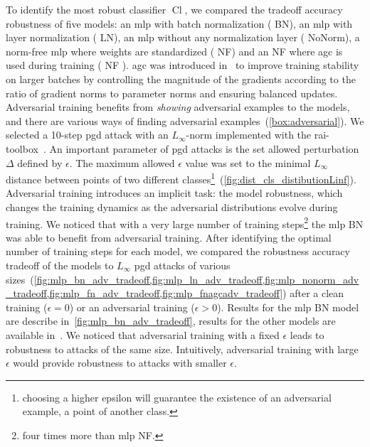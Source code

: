 \documentclass[../main.tex]{subfiles}
\begin{document}
		To identify the most robust classifier \(\operatorname{Cl}\), we compared the tradeoff accuracy robustness of five models: an \gls{mlp} with batch normalization ( BN), an \gls{mlp} with layer normalization ( LN), an \gls{mlp} without any normalization layer ( NoNorm), a norm-free \gls{mlp} where weights are standardized ( NF) and an  NF where \gls{agc} is used during training ( NF ).
		\Gls{agc} was introduced in~\cite{NoNormApplied} to improve training stability on larger batches by controlling the magnitude of the gradients according to the ratio of gradient norms to parameter norms and ensuring balanced updates.
		Adversarial training benefits from \emph{showing} adversarial examples to the models, and there are various ways of finding adversarial examples~(\cref{box:adversarial}).
		We selected a 10-step \gls{pgd} attack with an \(L_{\infty}\)-norm implemented with the {\sourcecode rai-toolbox}~\cite{soklaski2022toolspracticesresponsibleai}.
		An important parameter of \gls{pgd} attacks is the set allowed perturbation \(\Delta\) defined by \(\epsilon\).
		The maximum allowed \(\epsilon\) value was set to the minimal \(L_{\infty}\) distance between points of two different classes\footnote{choosing a higher epsilon will guarantee the existence of an adversarial example, \ie{} a point of another class.}~(\cref{fig:dist_cls_distibutionLinf}).
		Adversarial training introduces an implicit task: the model robustness, which changes the training dynamics as the adversarial distributions evolve during training.
		We noticed that with a very large number of training steps\footnote{four times more than \gls{mlp} NF.} the \gls{mlp} BN was able to benefit from adversarial training.
		After identifying the optimal number of training steps for each model, we compared the robustness accuracy tradeoff of the models to \(L_{\infty}\) \gls{pgd} attacks of various sizes~(\cref{fig:mlp_bn_adv_tradeoff,fig:mlp_ln_adv_tradeoff,fig:mlp_nonorm_adv_tradeoff,fig:mlp_fn_adv_tradeoff,fig:mlp_fnagcadv_tradeoff}) after a clean training (\(\epsilon = 0\)) or an adversarial training (\(\epsilon > 0\)).
		Results for the \gls{mlp} BN model are describe in~\cref{fig:mlp_bn_adv_tradeoff}, results for the other models  are available in~.
		We noticed that adversarial training with a fixed \(\epsilon\) leads to robustness to attacks of the same size.
		Intuitively, adversarial training with large \(\epsilon\) would provide robustness to attacks with smaller \(\epsilon\).
\end{document}
